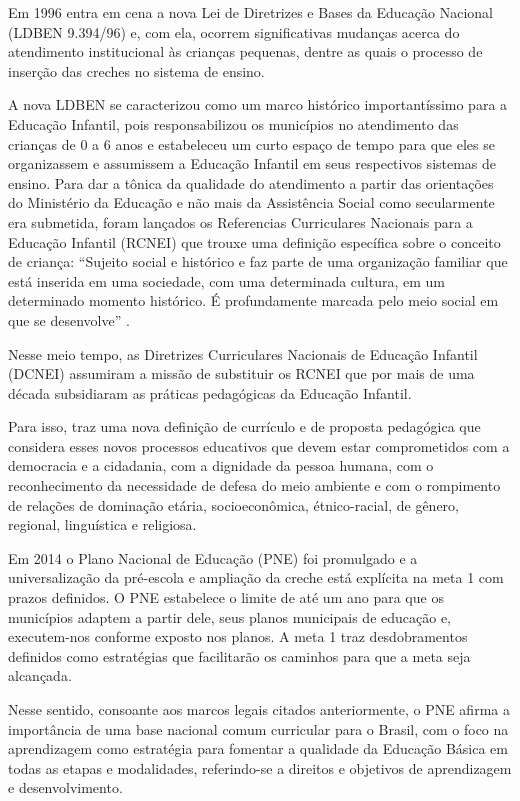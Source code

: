 \begin{refsection}
    Em 1996 entra em cena a nova Lei de Diretrizes e Bases da Educação Nacional (LDBEN 9.394/96) e, com ela, ocorrem significativas mudanças acerca do atendimento institucional às crianças pequenas, dentre as quais o processo de inserção das creches no sistema de ensino. 

    A nova LDBEN se caracterizou como um marco histórico importantíssimo para a Educação Infantil, pois responsabilizou os municípios no atendimento das crianças de 0 a 6 anos e estabeleceu um curto espaço de tempo para que eles se organizassem e assumissem a Educação Infantil em seus respectivos sistemas de ensino. Para dar a tônica da qualidade do atendimento a partir das orientações do Ministério da Educação e não mais da Assistência Social como secularmente era submetida, foram lançados os Referencias Curriculares Nacionais para a Educação Infantil (RCNEI) que trouxe uma definição específica sobre o conceito de criança: “Sujeito social e histórico e faz parte de uma organização familiar que está inserida em uma sociedade, com uma determinada cultura, em um determinado momento histórico. É profundamente marcada pelo meio social em que se desenvolve” \cite[p.~20]{RCNEI1998}.  

    Nesse meio tempo, as Diretrizes Curriculares Nacionais de Educação Infantil (DCNEI) assumiram a missão de substituir os RCNEI que por mais de uma década subsidiaram as práticas pedagógicas da Educação Infantil.  

    Para isso, traz uma nova definição de currículo e de proposta pedagógica que considera esses novos processos educativos que devem estar comprometidos com a democracia e a cidadania, com a dignidade da pessoa humana, com o reconhecimento da necessidade de defesa do meio ambiente e com o rompimento de relações de dominação etária, socioeconômica, étnico-racial, de gênero, regional, linguística e religiosa. 

    Em 2014 o Plano Nacional de Educação (PNE) foi promulgado e a universalização da pré-escola e ampliação da creche está explícita na meta 1 com prazos definidos. O PNE estabelece o limite de até um ano para que os municípios adaptem a partir dele, seus planos municipais de educação e, executem-nos conforme exposto nos planos. A meta 1 traz desdobramentos definidos como estratégias que facilitarão os caminhos para que a meta seja alcançada. 

    Nesse sentido, consoante aos marcos legais citados anteriormente, o PNE afirma a importância de uma base nacional comum curricular para o Brasil, com o foco na aprendizagem como estratégia para fomentar a qualidade da Educação Básica em todas as etapas e modalidades, referindo-se a direitos e objetivos de aprendizagem e desenvolvimento. 


\end{refsection}
